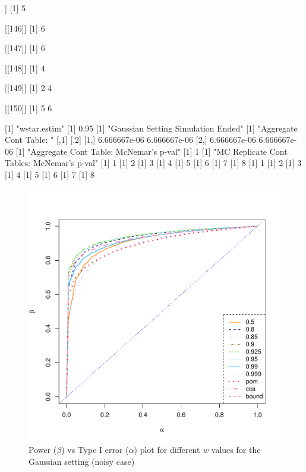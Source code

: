 \documentclass[11pt]{article} %
\begin{document}
\begin{Schunk}
\begin{Soutput}
[[145]]
[1] 5

[[146]]
[1] 6

[[147]]
[1] 6

[[148]]
[1] 4

[[149]]
[1] 2 4

[[150]]
[1] 5 6

[1] "wstar.estim"
[1] 0.95
[1] "Gaussian Setting Simulation Ended"
[1] "Aggregate Cont Table: "
             [,1]         [,2]
[1,] 6.666667e-06 6.666667e-06
[2,] 6.666667e-06 6.666667e-06
[1] "Aggregate Cont Table: McNemar's p-val"
[1] 1
[1] "MC Replicate Cont Tables: McNemar's p-val"
[1] 1
[1] 2
[1] 3
[1] 4
[1] 5
[1] 6
[1] 7
[1] 8
[1] 1
[1] 2
[1] 3
[1] 4
[1] 5
[1] 6
[1] 7
[1] 8
\end{Soutput}
\end{Schunk}


\begin{figure}
\includegraphics[scale=0.35]{MVN-FC-Tradeoff-OOSc0-01-n150.pdf}
\caption{Power ($\beta$) vs Type I error ($\alpha$) plot for different $w$ values for the Gaussian setting (noisy case)}
\label{fig:MVN-c001-power-alpha}
\end{figure}
\end{document}
